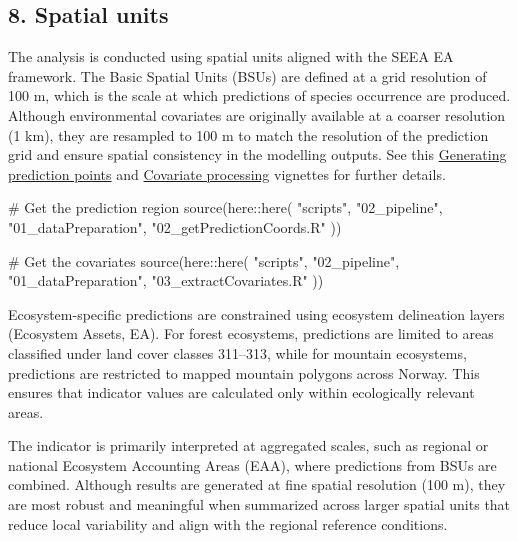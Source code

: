 \documentclass[
  letterpaper,
  DIV=11,
  numbers=noendperiod]{scrartcl}
\newenvironment{Shaded}{\begin{snugshade}}{\end{snugshade}}
\newcommand{\CommentTok}[1]{\textcolor[rgb]{0.37,0.37,0.37}{#1}}
\newcommand{\FunctionTok}[1]{\textcolor[rgb]{0.28,0.35,0.67}{#1}}
\newcommand{\NormalTok}[1]{\textcolor[rgb]{0.00,0.23,0.31}{#1}}
\newcommand{\SpecialCharTok}[1]{\textcolor[rgb]{0.37,0.37,0.37}{#1}}
\newcommand{\StringTok}[1]{\textcolor[rgb]{0.13,0.47,0.30}{#1}}
\begin{document}
\subsection{8. Spatial units}\label{spatial-units}

The analysis is conducted using spatial units aligned with the SEEA EA
framework. The Basic Spatial Units (BSUs) are defined at a grid
resolution of 100 m, which is the scale at which predictions of species
occurrence are produced. Although environmental covariates are
originally available at a coarser resolution (1 km), they are resampled
to 100 m to match the resolution of the prediction grid and ensure
spatial consistency in the modelling outputs. See this
\href{https://github.com/NINAnor/breedingBirdIndicator_OccupancyModelling/blob/main/vignettes/generating_prediction_points.qmd}{Generating
prediction points} and
\href{https://github.com/NINAnor/breedingBirdIndicator_OccupancyModelling/blob/main/vignettes/covariate_processing.qmd}{Covariate
processing} vignettes for further details.

\begin{Shaded}
\begin{Highlighting}[]
\CommentTok{\# Get the prediction region}
\FunctionTok{source}\NormalTok{(here}\SpecialCharTok{::}\FunctionTok{here}\NormalTok{(}
      \StringTok{"scripts"}\NormalTok{,}
      \StringTok{"02\_pipeline"}\NormalTok{,}
      \StringTok{"01\_dataPreparation"}\NormalTok{,}
      \StringTok{"02\_getPredictionCoords.R"}
\NormalTok{    ))}

\CommentTok{\# Get the covariates}
    \FunctionTok{source}\NormalTok{(here}\SpecialCharTok{::}\FunctionTok{here}\NormalTok{(}
      \StringTok{"scripts"}\NormalTok{,}
      \StringTok{"02\_pipeline"}\NormalTok{,}
      \StringTok{"01\_dataPreparation"}\NormalTok{,}
      \StringTok{"03\_extractCovariates.R"}
\NormalTok{    ))}
\end{Highlighting}
\end{Shaded}

Ecosystem-specific predictions are constrained using ecosystem
delineation layers (Ecosystem Assets, EA). For forest ecosystems,
predictions are limited to areas classified under land cover classes
311--313, while for mountain ecosystems, predictions are restricted to
mapped mountain polygons across Norway. This ensures that indicator
values are calculated only within ecologically relevant areas.

The indicator is primarily interpreted at aggregated scales, such as
regional or national Ecosystem Accounting Areas (EAA), where predictions
from BSUs are combined. Although results are generated at fine spatial
resolution (100 m), they are most robust and meaningful when summarized
across larger spatial units that reduce local variability and align with
the regional reference conditions.
\end{document}
